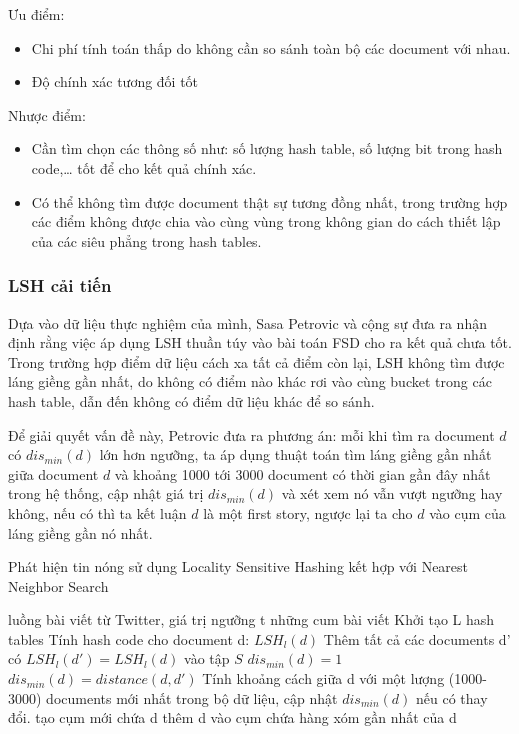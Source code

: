 	Ưu điểm:
	\begin{itemize}
		\item Chi phí tính toán thấp do không cần so sánh toàn bộ các document với nhau.
		\item Độ chính xác tương đối tốt
	\end{itemize}

	Nhược điểm:
	\begin{itemize}
		\item Cần tìm chọn các thông số như: số lượng hash table, số lượng bit trong hash code,… tốt để cho kết quả chính xác.
		\item Có thể không tìm được document thật sự tương đồng nhất, trong trường hợp các điểm không được chia vào cùng vùng trong không gian do cách thiết lập của các siêu phẳng trong hash tables.
	\end{itemize}
	
	\subsubsection{LSH cải tiến}
	Dựa vào dữ liệu thực nghiệm của mình, Sasa Petrovic và cộng sự \cite{Petrovic:LSH} đưa ra nhận định rằng việc áp dụng LSH thuần túy vào bài toán FSD cho ra kết quả chưa tốt. Trong trường hợp điểm dữ liệu cách xa tất cả điểm còn lại, LSH không tìm được láng giềng gần nhất, do không có điểm nào khác rơi vào cùng bucket trong các hash table, dẫn đến không có điểm dữ liệu khác để so sánh. 
	
	Để giải quyết vấn đề này, Petrovic đưa ra phương án: mỗi khi tìm ra document $d$ có $dis_{min}(d)$ lớn hơn ngưỡng, ta áp dụng thuật toán tìm láng giềng gần nhất giữa document $d$ và khoảng 1000 tới 3000 document có thời gian gần đây nhất trong hệ thống, cập nhật giá trị $dis_{min}(d)$ và xét xem nó vẫn vượt ngưỡng hay không, nếu có thì ta kết luận $d$ là một first story, ngược lại ta cho $d$ vào cụm của láng giềng gần nó nhất.
	
	\begin{algorithm}[H]
		\caption{Phát hiện tin nóng sử dụng Locality Sensitive Hashing kết hợp với Nearest Neighbor Search}
		\begin{algorithmic}[1]
			\REQUIRE luồng bài viết từ Twitter, giá trị ngưỡng t
			\ENSURE những cum bài viết
			\State Khởi tạo L hash tables
					\State Tính hash code cho document d: $LSH_l(d)$
					\State Thêm tất cả các documents d' có $LSH_l(d') = LSH_l(d)$ vào tập $S$
				\ENDFOR
				\State $dis_{min}(d) = 1$
					\unboldmath
					\State $dis_{min}(d) = distance(d,d')$
					\ENDIF
				\ENDFOR
					\State Tính khoảng cách giữa d với một lượng (1000-3000) documents mới nhất trong bộ dữ liệu, cập nhật $dis_{min}(d)$ nếu có thay đổi.
				\ENDIF
					\STATE tạo cụm mới chứa d
				\ELSE
					\STATE thêm d vào cụm chứa hàng xóm gần nhất của d
				\ENDIF
			\ENDFOR		
			
		\end{algorithmic}
	\end{algorithm}

